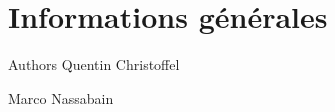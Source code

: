 \hypertarget{index_Partie1}{}\section{Informations générales}\label{index_Partie1}
\begin{DoxyAuthor}{Authors}
Quentin Christoffel 

Marco Nassabain 
\end{DoxyAuthor}

